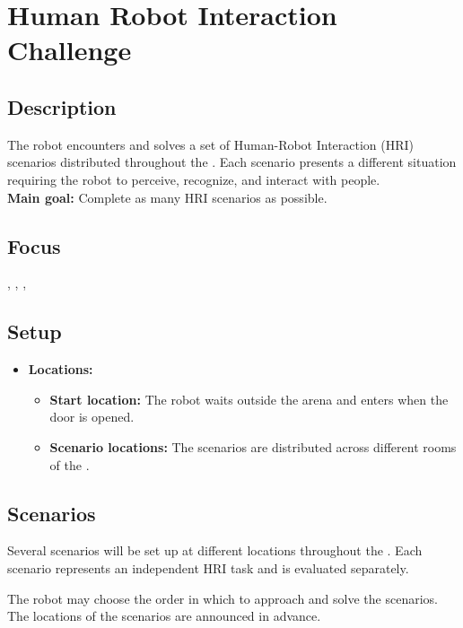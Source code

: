 \section{Human Robot Interaction Challenge}
\label{test:human-robot-interaction-challenge}

\subsection*{Description}
The robot encounters and solves a set of Human-Robot Interaction (HRI) scenarios distributed throughout the \Arena{}. Each scenario presents a different situation requiring the robot to perceive, recognize, and interact with people.\\
    
\textbf{Main goal:}
    Complete as many HRI scenarios as possible.


\subsection*{Focus}
\emph{\SysI{}}, \emph{\HRI{}}, \emph{\PerDet{}}, \emph{\PerRec{}}

\subsection*{Setup}
\begin{itemize}
	\item \textbf{Locations:}
		\begin{itemize}
			\item \textbf{Start location:} The robot waits outside the arena and enters when the door is opened.
			\item \textbf{Scenario locations:} The scenarios are distributed across different rooms of the \Arena{}.
		\end{itemize}
\end{itemize}


\subsection*{Scenarios}
Several scenarios will be set up at different locations throughout the \Arena{}. Each scenario represents an independent HRI task and is evaluated separately.

The robot may choose the order in which to approach and solve the scenarios. The locations of the scenarios are announced in advance.


